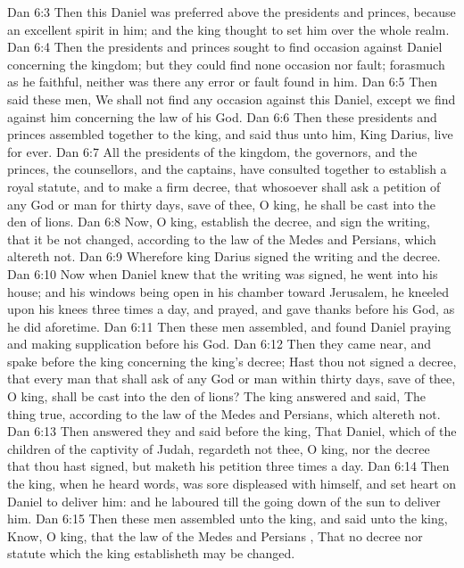 \vs Dan 6:3 Then this Daniel was preferred above the presidents and princes, because an excellent spirit  in him; and the king thought to set him over the whole realm.
\vs Dan 6:4 Then the presidents and princes sought to find occasion against Daniel concerning the kingdom; but they could find none occasion nor fault; forasmuch as he  faithful, neither was there any error or fault found in him.
\vs Dan 6:5 Then said these men, We shall not find any occasion against this Daniel, except we find  against him concerning the law of his God.
\vs Dan 6:6 Then these presidents and princes assembled together to the king, and said thus unto him, King Darius, live for ever.
\vs Dan 6:7 All the presidents of the kingdom, the governors, and the princes, the counsellors, and the captains, have consulted together to establish a royal statute, and to make a firm decree, that whosoever shall ask a petition of any God or man for thirty days, save of thee, O king, he shall be cast into the den of lions.
\vs Dan 6:8 Now, O king, establish the decree, and sign the writing, that it be not changed, according to the law of the Medes and Persians, which altereth not.
\vs Dan 6:9 Wherefore king Darius signed the writing and the decree.
\vs Dan 6:10 Now when Daniel knew that the writing was signed, he went into his house; and his windows being open in his chamber toward Jerusalem, he kneeled upon his knees three times a day, and prayed, and gave thanks before his God, as he did aforetime.
\vs Dan 6:11 Then these men assembled, and found Daniel praying and making supplication before his God.
\vs Dan 6:12 Then they came near, and spake before the king concerning the king's decree; Hast thou not signed a decree, that every man that shall ask  of any God or man within thirty days, save of thee, O king, shall be cast into the den of lions? The king answered and said, The thing  true, according to the law of the Medes and Persians, which altereth not.
\vs Dan 6:13 Then answered they and said before the king, That Daniel, which  of the children of the captivity of Judah, regardeth not thee, O king, nor the decree that thou hast signed, but maketh his petition three times a day.
\vs Dan 6:14 Then the king, when he heard  words, was sore displeased with himself, and set  heart on Daniel to deliver him: and he laboured till the going down of the sun to deliver him.
\vs Dan 6:15 Then these men assembled unto the king, and said unto the king, Know, O king, that the law of the Medes and Persians , That no decree nor statute which the king establisheth may be changed.

